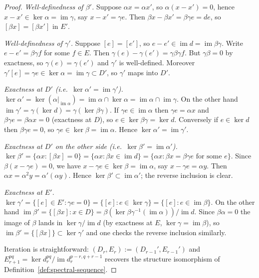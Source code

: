 \documentclass[12pt,a4paper]{article}
\theoremstyle{definition}
\begin{document}
\begin{proof}
\textit{Well-definedness of $\beta'$.}  Suppose $\alpha x=\alpha x'$, so
$\alpha(x-x')=0$, hence $x-x'\in\ker\alpha=\operatorname{im}\gamma$, say
$x-x'=\gamma e$.  Then $\beta x - \beta x'=\beta\gamma e = de$, so
$[\beta x]=[\beta x']$ in $E'$.

\textit{Well-definedness of $\gamma'$.}  Suppose $[e]=[e']$, so $e-e'\in\operatorname{im} d
= \operatorname{im}\beta\gamma$.  Write $e-e'=\beta\gamma f$ for some $f\in E$.
Then $\gamma(e)-\gamma(e')=\gamma\beta\gamma f$.  But $\gamma\beta=0$ by exactness,
so $\gamma(e)=\gamma(e')$ and $\gamma'$ is well-defined.  Moreover $\gamma'[e]=
\gamma e\in\ker\alpha=\operatorname{im}\gamma\subset D'$, so $\gamma'$ maps into $D'$.

\textit{Exactness at $D'$ (i.e.\ $\ker\alpha'=\operatorname{im}\gamma'$).}
$\ker\alpha' = \ker(\alpha|_{\operatorname{im}\alpha})
= \operatorname{im}\alpha\cap\ker\alpha
= \operatorname{im}\alpha\cap\operatorname{im}\gamma$.
On the other hand $\operatorname{im}\gamma'
=\gamma(\ker d)=\gamma(\ker\beta\gamma)$.
If $\gamma e\in\operatorname{im}\alpha$ then $\gamma e=\alpha x$ and
$\beta\gamma e=\beta\alpha x=0$ (exactness at $D$), so $e\in\ker\beta\gamma=\ker d$.
Conversely if $e\in\ker d$ then $\beta\gamma e=0$, so $\gamma e\in\ker\beta=
\operatorname{im}\alpha$.  Hence $\ker\alpha'=\operatorname{im}\gamma'$.

\textit{Exactness at $D'$ on the other side
(i.e.\ $\ker\beta'=\operatorname{im}\alpha'$).}
$\ker\beta' = \{\alpha x : [\beta x]=0\} = \{\alpha x : \beta x\in\operatorname{im} d\}
= \{\alpha x : \beta x = \beta\gamma e\text{ for some }e\}$.
Since $\beta(x-\gamma e)=0$, we have $x-\gamma e\in\ker\beta=\operatorname{im}\alpha$,
say $x-\gamma e=\alpha y$.  Then $\alpha x=\alpha^2 y=\alpha'(\alpha y)$.
Hence $\ker\beta'\subset\operatorname{im}\alpha'$; the reverse inclusion is clear.

\textit{Exactness at $E'$.}
$\ker\gamma' = \{[e]\in E': \gamma e=0\} = \{[e]: e\in\ker\gamma\}
= \{[e]: e\in\operatorname{im}\beta\}$.
On the other hand $\operatorname{im}\beta' = \{[\beta x]: x\in D\}
= \beta(\ker\beta\gamma^{-1}(\operatorname{im}\alpha))/\operatorname{im} d$.
Since $\beta\alpha=0$ the image of $\beta$ lands in $\ker\gamma/\operatorname{im} d$
(by exactness at $E$, $\ker\gamma=\operatorname{im}\beta$), so
$\operatorname{im}\beta'=\{[\beta x]\}\subset\ker\gamma'$ and one checks the
reverse inclusion similarly.

Iteration is straightforward: $(D_r,E_r):=(D_{r-1}',E_{r-1}')$ and
$E_{r+1}^{pq}=\ker d_r^{pq}/\operatorname{im}d_r^{p-r,q+r-1}$ recovers the structure
isomorphism of Definition~\ref{def:spectral-sequence}.
\end{proof}
\end{document}

